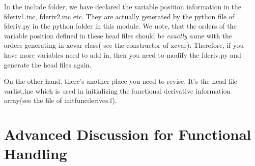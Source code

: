In the include folder, we have declared the variable position
information in the fderiv1.inc, fderiv2.inc etc. They are 
actually generated by the python file of fderiv.py in the python
folder in this module. We note, that the orders of the 
variable position defined in these head files should be 
\emph{exactly} same with the orders generating in xcvar class(
see the constructor of xcvar). Therefore, if you have more 
variables need to add in, then you need to modify the 
fderiv.py and generate the head files again.

On the other hand, there's another place you need to revise. 
It's the head file varlist.inc which is used in initializing 
the functional derivative information array(see the file of 
initfuncderives.f).


\section{Advanced Discussion for Functional Handling}




